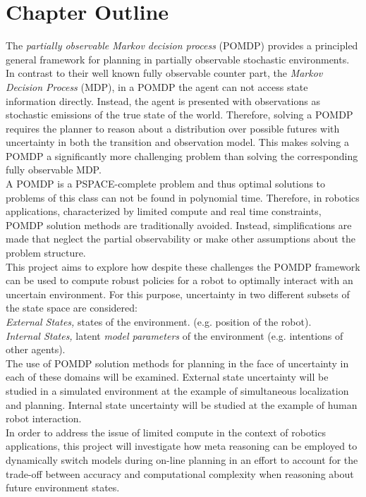 \section{Chapter Outline}


The \textit{partially observable Markov decision process} (POMDP) provides
a principled general framework for planning in partially observable stochastic
environments. In contrast to their well known fully observable counter part,
the \textit{Markov Decision Process} (MDP), in a POMDP the agent can not access
state information directly. Instead, the agent is presented with observations
as stochastic emissions of the true state of the world. Therefore, solving
a POMDP requires the planner to reason about a distribution over possible
futures with uncertainty in both the transition and observation model. This
makes solving a POMDP a significantly more challenging problem than solving the
corresponding fully observable MDP.\\

A POMDP is a PSPACE-complete problem and thus optimal solutions to problems of
this class can not be found in polynomial time. Therefore, in robotics
applications, characterized by limited compute and real time constraints, POMDP
solution methods are traditionally avoided. Instead, simplifications are made
that neglect the partial observability or make other assumptions about the
problem structure.\\

This project aims to explore how despite these challenges the POMDP
framework can be used to compute robust policies for a robot to optimally
interact with an uncertain environment. For this purpose, uncertainty in
two different subsets of the state space are considered:\\
\textit{External States,}  states of the environment. (e.g. position of the
robot).\\
\textit{Internal States,} latent \textit{model parameters} of the
environment (e.g. intentions of other agents).\\

The use of POMDP solution methods for planning in the face of uncertainty in
each of these domains will be examined. External state uncertainty will be
studied in a simulated environment at the example of simultaneous localization
and planning. Internal state uncertainty will be studied at the example of
human robot interaction.\\
In order to address the issue of limited compute in the context of robotics
applications, this project will investigate how meta reasoning can be employed to
dynamically switch models during on-line planning in an effort to account for
the trade-off between accuracy and computational complexity when reasoning about
future environment states.
